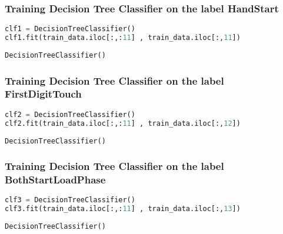 \hypertarget{training-decision-tree-classifier-on-the-label-handstart}{%
\subsubsection{Training Decision Tree Classifier on the label
HandStart}\label{training-decision-tree-classifier-on-the-label-handstart}}

\begin{lstlisting}[language=Python]
clf1 = DecisionTreeClassifier()
clf1.fit(train_data.iloc[:,:11] , train_data.iloc[:,11])
\end{lstlisting}

\begin{lstlisting}
DecisionTreeClassifier()
\end{lstlisting}

\hypertarget{training-decision-tree-classifier-on-the-label-firstdigittouch}{%
\subsubsection{Training Decision Tree Classifier on the label
FirstDigitTouch}\label{training-decision-tree-classifier-on-the-label-firstdigittouch}}

\begin{lstlisting}[language=Python]
clf2 = DecisionTreeClassifier()
clf2.fit(train_data.iloc[:,:11] , train_data.iloc[:,12])
\end{lstlisting}

\begin{lstlisting}
DecisionTreeClassifier()
\end{lstlisting}

\hypertarget{training-decision-tree-classifier-on-the-label-bothstartloadphase}{%
\subsubsection{Training Decision Tree Classifier on the label
BothStartLoadPhase}\label{training-decision-tree-classifier-on-the-label-bothstartloadphase}}

\begin{lstlisting}[language=Python]
clf3 = DecisionTreeClassifier()
clf3.fit(train_data.iloc[:,:11] , train_data.iloc[:,13])
\end{lstlisting}

\begin{lstlisting}
DecisionTreeClassifier()
\end{lstlisting}

